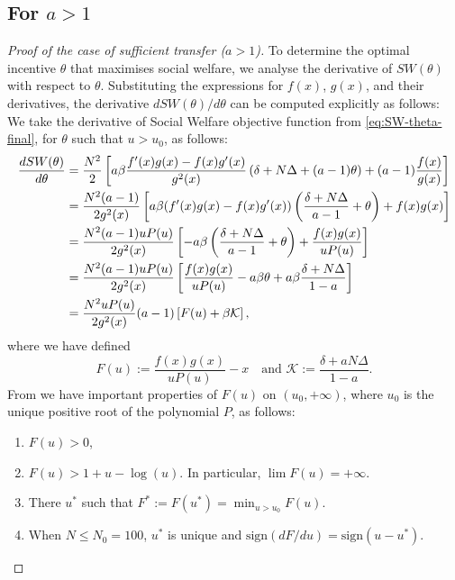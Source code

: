 \documentclass{article}
\begin{document}
\subsection{For $a>1$}

\begin{proof}[Proof of the case of sufficient transfer ($a>1$)]

To determine the optimal incentive $\theta$ that maximises social welfare, we analyse the derivative of $SW(\theta)$ with respect to $\theta$. Substituting the expressions for $f(x)$, $g(x)$, and their derivatives, the derivative $dSW(\theta)/d\theta$ can be computed explicitly as follows:
We take the derivative of Social Welfare objective function from  \ref{eq:SW-theta-final}, for $\theta$ such that $u > u_0$, as follows:
\begin{align}
    \frac{dSW(\theta)}{d\theta} &= \frac{N^2}{2}\left[ a\beta\frac{f'(x)g(x) - f(x)g'(x)}{g^2(x)}\left(\delta + N\Delta + (a-1)\theta\right) + (a-1)\frac{f(x)}{g(x)}\right]\notag \\
    &= \frac{N^2(a-1)}{2g^2(x)}\left[a\beta(f'(x)g(x)-f(x)g'(x)) \left( \frac{\delta + N\Delta}{a-1} + \theta \right) + f(x)g(x) \right]\notag\\
&= \frac{N^2(a-1)uP(u)}{2g^2(x)}\left[-a\beta \left( \frac{\delta + N\Delta}{a-1} + \theta \right) + \frac{f(x)g(x)}{uP(u)} \right]\notag\\
    &= \frac{N^2(a-1)uP(u)}{2g^2(x)} \left[\frac{f(x)g(x)}{uP(u)} - a\beta\theta + a\beta\frac{\delta + N\Delta}{1-a} \right] \notag
\\&= \frac{N^2 u P(u)}{2 g^2(x)} (a-1) \left[ F(u) + \beta \mathcal{K} \right],\label{dSW}
\end{align}
where we have defined
\begin{equation}
\label{eq: def F}
F(u):=\frac{f(x)g(x)}{uP(u)} - x\quad
    \text{and } \mathcal{K}:=\frac{\delta + aN\Delta}{1-a}.
\end{equation} 
From \cite{duonghan2021cost} we have important properties of $F(u)$ on $(u_0, +\infty)$, where $u_0$ is the unique positive root of the polynomial $P$,  as follows:
\begin{enumerate}
    \item[(F1)] $F(u)>0$,
    \item[(F2)] $F(u) > 1+u-\log(u)$. In particular, $ \lim{F(u)} = +\infty$.
    \item[(F3)] There $u^*$ such that $ F^*:=F(u^*)=\min_{u>u_0}F(u)$.
    \item[(F4)] When $N \le N_0 = 100$, $u^*$ is unique and $\textrm{sign}(dF/du)=\textrm{sign}(u-u^*)$.
\end{enumerate}


\end{proof}
\end{document}
